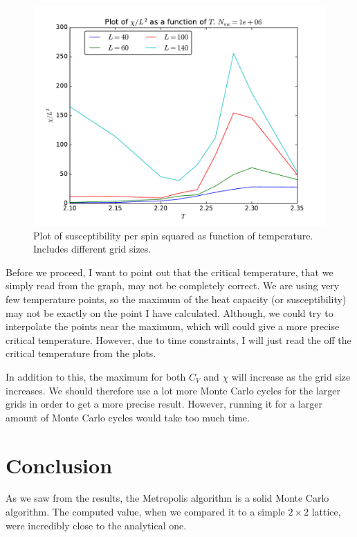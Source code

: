 \documentclass[12pt]{article}
\begin{document}
\begin{figure}[H]
\centering
\includegraphics[width=\linewidth]{Plots/Susceptibility_parallellization.pdf}
\caption{Plot of susceptibility per spin squared as function of temperature. Includes different grid sizes.}
\label{fig:parallell_susceptiblity}
\end{figure}

Before we proceed, I want to point out that the critical temperature, that we simply read from the graph, may not be completely correct. We are using very few temperature points, so the maximum of the heat capacity (or susceptibility) may not be exactly on the point I have calculated. Although, we could try to interpolate the points near the maximum, which will could give a more precise critical temperature. However, due to time constraints, I will just read the off the critical temperature from the plots.
 
In addition to this, the maximum for both $C_V$ and $\chi$ will increase as the grid size increases. We should therefore use a lot more Monte Carlo cycles for the larger grids in order to get a more precise result. However, running it for a larger amount of Monte Carlo cycles would take too much time.

\FloatBarrier
\section{Conclusion} \label{section:conclusion}
As we saw from the results, the Metropolis algorithm is a solid Monte Carlo algorithm. The computed value, when we compared it to a simple $2\times 2$ lattice, were incredibly close to the analytical one. 
\end{document}
